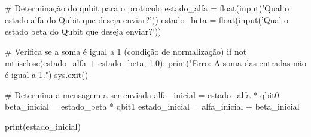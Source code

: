 \begin{pycode}
    # Determinação do qubit para o protocolo
    estado_alfa = float(input('Qual o estado alfa do Qubit que deseja enviar?'))
    estado_beta = float(input('Qual o estado beta do Qubit que deseja enviar?'))

    # Verifica se a soma é igual a 1 (condição de normalização)
    if not mt.isclose(estado_alfa + estado_beta, 1.0):
        print("Erro: A soma das entradas não é igual a 1.")
        sys.exit()

    # Determina a mensagem a ser enviada
    alfa_inicial = estado_alfa * qbit0
    beta_inicial = estado_beta * qbit1
    estado_inicial = alfa_inicial + beta_inicial

    print(estado_inicial)
\end{pycode}

